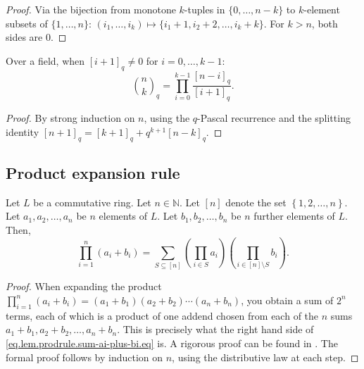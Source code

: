 \begin{proof}
\leanok
Via the bijection from monotone $k$-tuples in $\{0,\ldots,n{-}k\}$ to $k$-element
subsets of $\{1,\ldots,n\}$: $(i_1,\ldots,i_k) \mapsto \{i_1{+}1, i_2{+}2, \ldots, i_k{+}k\}$.
For $k > n$, both sides are 0.
\end{proof}

\begin{lemma}
\label{lem.qbinomial-formulas.prod-div}
\leanhelper
\leanok
Over a field, when $[i{+}1]_q \ne 0$ for $i = 0, \ldots, k{-}1$:
\[
\binom{n}{k}_q = \prod_{i=0}^{k-1} \frac{[n-i]_q}{[i+1]_q}.
\]
\end{lemma}

\begin{proof}
\leanok
By strong induction on $n$, using the $q$-Pascal recurrence and the splitting identity
$[n{+}1]_q = [k{+}1]_q + q^{k+1} [n{-}k]_q$.
\end{proof}

\subsection{Product expansion rule}

\begin{lemma}
\label{lem.prodrule.sum-ai-plus-bi}
\leantarget
\leanok
Let $L$ be a commutative ring. Let
$n\in\mathbb{N}$. Let $\left[  n\right]  $ denote the set $\left\{
1,2,\ldots,n\right\}  $. Let $a_{1},a_{2},\ldots,a_{n}$ be $n$ elements of
$L$. Let $b_{1},b_{2},\ldots,b_{n}$ be $n$ further elements of $L$. Then,
\begin{equation}
\prod_{i=1}^{n}\left(  a_{i}+b_{i}\right)  =\sum_{S\subseteq\left[  n\right]
}\left(  \prod_{i\in S}a_{i}\right)  \left(  \prod_{i\in\left[  n\right]
\setminus S}b_{i}\right)  . \label{eq.lem.prodrule.sum-ai-plus-bi.eq}
\end{equation}
\end{lemma}

\begin{proof}
\leanok
When expanding the product $\prod_{i=1}^{n}\left(  a_{i}+b_{i}\right)
=\left(  a_{1}+b_{1}\right)  \left(  a_{2}+b_{2}\right)  \cdots\left(
a_{n}+b_{n}\right)  $, you obtain a sum of $2^{n}$ terms, each of which is a
product of one addend chosen from each of the $n$ sums $a_{1}+b_{1}%
,a_{2}+b_{2},\ldots,a_{n}+b_{n}$. This is precisely what the right hand side
of \eqref{eq.lem.prodrule.sum-ai-plus-bi.eq} is.
A rigorous proof can be found in \cite[Exercise 6.1 \textbf{(a)}]{detnotes}.
The formal proof follows by induction on $n$, using the distributive law at each step.
\end{proof}

